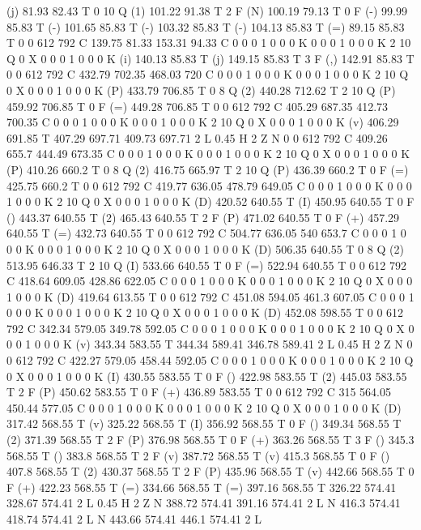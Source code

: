 (j) 81.93 82.43 T
0 10 Q
(1) 101.22 91.38 T
2 F
(N) 100.19 79.13 T
0 F
(-) 99.99 85.83 T
(-) 101.65 85.83 T
(-) 103.32 85.83 T
(-) 104.13 85.83 T
(=) 89.15 85.83 T
0 0 612 792 C
139.75 81.33 153.31 94.33 C
0 0 0 1 0 0 0 K
0 0 0 1 0 0 0 K
2 10 Q
0 X
0 0 0 1 0 0 0 K
(i) 140.13 85.83 T
(j) 149.15 85.83 T
3 F
(,) 142.91 85.83 T
0 0 612 792 C
432.79 702.35 468.03 720 C
0 0 0 1 0 0 0 K
0 0 0 1 0 0 0 K
2 10 Q
0 X
0 0 0 1 0 0 0 K
(P) 433.79 706.85 T
0 8 Q
(2) 440.28 712.62 T
2 10 Q
(P) 459.92 706.85 T
0 F
(=) 449.28 706.85 T
0 0 612 792 C
405.29 687.35 412.73 700.35 C
0 0 0 1 0 0 0 K
0 0 0 1 0 0 0 K
2 10 Q
0 X
0 0 0 1 0 0 0 K
(v) 406.29 691.85 T
407.29 697.71 409.73 697.71 2 L
0.45 H
2 Z
N
0 0 612 792 C
409.26 655.7 444.49 673.35 C
0 0 0 1 0 0 0 K
0 0 0 1 0 0 0 K
2 10 Q
0 X
0 0 0 1 0 0 0 K
(P) 410.26 660.2 T
0 8 Q
(2) 416.75 665.97 T
2 10 Q
(P) 436.39 660.2 T
0 F
(=) 425.75 660.2 T
0 0 612 792 C
419.77 636.05 478.79 649.05 C
0 0 0 1 0 0 0 K
0 0 0 1 0 0 0 K
2 10 Q
0 X
0 0 0 1 0 0 0 K
(D) 420.52 640.55 T
(I) 450.95 640.55 T
0 F
() 443.37 640.55 T
(2) 465.43 640.55 T
2 F
(P) 471.02 640.55 T
0 F
(+) 457.29 640.55 T
(=) 432.73 640.55 T
0 0 612 792 C
504.77 636.05 540 653.7 C
0 0 0 1 0 0 0 K
0 0 0 1 0 0 0 K
2 10 Q
0 X
0 0 0 1 0 0 0 K
(D) 506.35 640.55 T
0 8 Q
(2) 513.95 646.33 T
2 10 Q
(I) 533.66 640.55 T
0 F
(=) 522.94 640.55 T
0 0 612 792 C
418.64 609.05 428.86 622.05 C
0 0 0 1 0 0 0 K
0 0 0 1 0 0 0 K
2 10 Q
0 X
0 0 0 1 0 0 0 K
(D) 419.64 613.55 T
0 0 612 792 C
451.08 594.05 461.3 607.05 C
0 0 0 1 0 0 0 K
0 0 0 1 0 0 0 K
2 10 Q
0 X
0 0 0 1 0 0 0 K
(D) 452.08 598.55 T
0 0 612 792 C
342.34 579.05 349.78 592.05 C
0 0 0 1 0 0 0 K
0 0 0 1 0 0 0 K
2 10 Q
0 X
0 0 0 1 0 0 0 K
(v) 343.34 583.55 T
344.34 589.41 346.78 589.41 2 L
0.45 H
2 Z
N
0 0 612 792 C
422.27 579.05 458.44 592.05 C
0 0 0 1 0 0 0 K
0 0 0 1 0 0 0 K
2 10 Q
0 X
0 0 0 1 0 0 0 K
(I) 430.55 583.55 T
0 F
() 422.98 583.55 T
(2) 445.03 583.55 T
2 F
(P) 450.62 583.55 T
0 F
(+) 436.89 583.55 T
0 0 612 792 C
315 564.05 450.44 577.05 C
0 0 0 1 0 0 0 K
0 0 0 1 0 0 0 K
2 10 Q
0 X
0 0 0 1 0 0 0 K
(D) 317.42 568.55 T
(v) 325.22 568.55 T
(I) 356.92 568.55 T
0 F
() 349.34 568.55 T
(2) 371.39 568.55 T
2 F
(P) 376.98 568.55 T
0 F
(+) 363.26 568.55 T
3 F
() 345.3 568.55 T
() 383.8 568.55 T
2 F
(v) 387.72 568.55 T
(v) 415.3 568.55 T
0 F
() 407.8 568.55 T
(2) 430.37 568.55 T
2 F
(P) 435.96 568.55 T
(v) 442.66 568.55 T
0 F
(+) 422.23 568.55 T
(=) 334.66 568.55 T
(=) 397.16 568.55 T
326.22 574.41 328.67 574.41 2 L
0.45 H
2 Z
N
388.72 574.41 391.16 574.41 2 L
N
416.3 574.41 418.74 574.41 2 L
N
443.66 574.41 446.1 574.41 2 L
